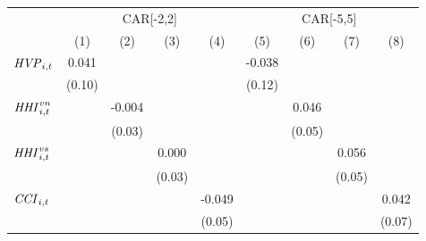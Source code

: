 {
\def\sym#1{\ifmmode^{#1}\else\(^{#1}\)\fi}
\begin{tabular}{l*{8}{c}}
\toprule
                    &\multicolumn{4}{c}{CAR[-2,2]}                                                          &\multicolumn{4}{c}{CAR[-5,5]}                                                          \\\cmidrule(lr){2-5}\cmidrule(lr){6-9}
                    &\multicolumn{1}{c}{(1)}         &\multicolumn{1}{c}{(2)}         &\multicolumn{1}{c}{(3)}         &\multicolumn{1}{c}{(4)}         &\multicolumn{1}{c}{(5)}         &\multicolumn{1}{c}{(6)}         &\multicolumn{1}{c}{(7)}         &\multicolumn{1}{c}{(8)}         \\
\midrule
${\it HVP}_{i,t}$   &       0.041         &                     &                     &                     &      -0.038         &                     &                     &                     \\
                    &      (0.10)         &                     &                     &                     &      (0.12)         &                     &                     &                     \\
${\it HHI}^{vn}_{i,t}$&                     &      -0.004         &                     &                     &                     &       0.046         &                     &                     \\
                    &                     &      (0.03)         &                     &                     &                     &      (0.05)         &                     &                     \\
${\it HHI}^{vs}_{i,t}$&                     &                     &       0.000         &                     &                     &                     &       0.056         &                     \\
                    &                     &                     &      (0.03)         &                     &                     &                     &      (0.05)         &                     \\
${\it CCI}_{i,t}$   &                     &                     &                     &      -0.049         &                     &                     &                     &       0.042         \\
                    &                     &                     &                     &      (0.05)         &                     &                     &                     &      (0.07)         \\

\end{tabular}}
